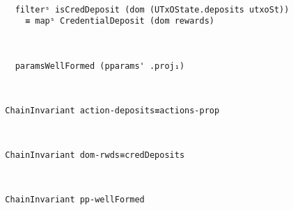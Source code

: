 \begin{itemize}
  \begin{property}\

  \begin{verbatim}
    filterˢ isCredDeposit (dom (UTxOState.deposits utxoSt)) 
      ≡ mapˢ CredentialDeposit (dom rewards)
  \end{verbatim}
  \end{property}

  \begin{property}\

  \begin{verbatim}
    paramsWellFormed (pparams' .proj₁)
  \end{verbatim}
  \end{property}


  \begin{property}\

  \begin{verbatim}
  ChainInvariant action-deposits≡actions-prop
  \end{verbatim}
  \end{property}


  \begin{property}\

  \begin{verbatim}
  ChainInvariant dom-rwds≡credDeposits
  \end{verbatim}
  \end{property}


  \begin{property}\

  \begin{verbatim}
  ChainInvariant pp-wellFormed
  \end{verbatim}
  \end{property}



\end{itemize}
